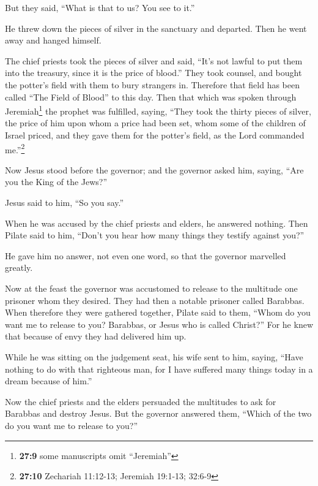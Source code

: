 But they said, ``What is that to us? You see to it.''

 He threw down the pieces of silver in the sanctuary and
departed. Then he went away and hanged himself.

 The chief priests took the pieces of silver and said,
``It's not lawful to put them into the treasury, since it is the price
of blood.''  They took counsel, and bought the potter's
field with them to bury strangers in.  Therefore that
field has been called ``The Field of Blood'' to this day. 
Then that which was spoken through Jeremiah\footnote{\textbf{27:9} some
  manuscripts omit ``Jeremiah''} the prophet was fulfilled, saying,
``They took the thirty pieces of silver, the price of him upon whom a
price had been set, whom some of the children of Israel priced,
 and they gave them for the potter's field, as the Lord
commanded me.''\footnote{\textbf{27:10} Zechariah 11:12-13; Jeremiah
  19:1-13; 32:6-9}

 Now Jesus stood before the governor; and the governor
asked him, saying, ``Are you the King of the Jews?''

Jesus said to him, ``So you say.''

 When he was accused by the chief priests and elders, he
answered nothing.  Then Pilate said to him, ``Don't you
hear how many things they testify against you?''

 He gave him no answer, not even one word, so that the
governor marvelled greatly.

 Now at the feast the governor was accustomed to release
to the multitude one prisoner whom they desired.  They
had then a notable prisoner called Barabbas.  When
therefore they were gathered together, Pilate said to them, ``Whom do
you want me to release to you? Barabbas, or Jesus who is called
Christ?''  For he knew that because of envy they had
delivered him up.

 While he was sitting on the judgement seat, his wife
sent to him, saying, ``Have nothing to do with that righteous man, for I
have suffered many things today in a dream because of him.''

 Now the chief priests and the elders persuaded the
multitudes to ask for Barabbas and destroy Jesus.  But
the governor answered them, ``Which of the two do you want me to release
to you?''

